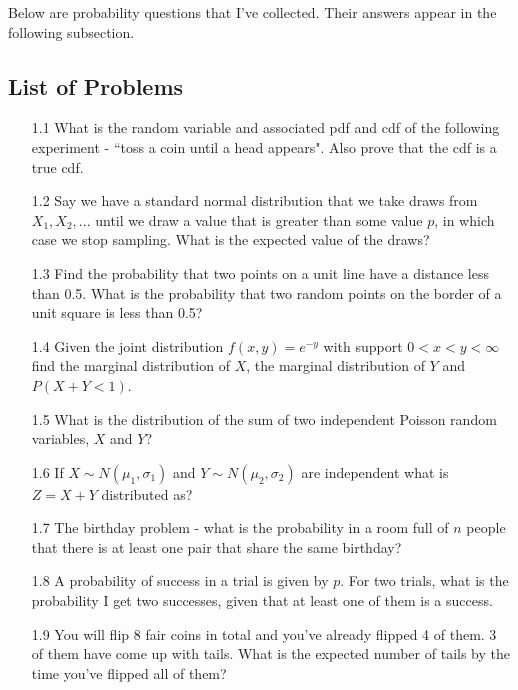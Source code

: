 Below are probability questions that I've collected. Their answers appear in the following subsection.

\subsection{List of Problems}

\begin{enumerate}
\item[1.1] What is the random variable and associated pdf and cdf of the following experiment - ``toss a coin until a head appears". Also prove that the cdf is a true cdf.

\item[1.2] Say we have a standard normal distribution that we take draws from $X_1, X_2, ...$ until we draw a value that is greater than some value $p$, in which case we stop sampling. What is the expected value of the draws?

\item[1.3] Find the probability that two points on a unit line have a distance less than 0.5. What is the probability that two random points on the border of a unit square is less than 0.5?

\item[1.4] Given the joint distribution $f(x,y) = e^{-y}$ with support $0<x<y< \infty$ find the marginal distribution of $X$, the marginal distribution of $Y$ and $P(X+Y<1)$.

\item[1.5] What is the distribution of the sum of two independent Poisson random variables, $X$ and $Y$?

\item[1.6] If $X \sim N(\mu_1, \sigma_1)$ and $Y \sim N(\mu_2, \sigma_2)$ are independent what is $Z=X+Y$ distributed as?

\item[1.7] The birthday problem - what is the probability in a room full of $n$ people that there is at least one pair that share the same birthday?

\item[1.8] A probability of success in a trial is given by $p$. For two trials, what is the probability I get two successes, given that at least one of them is a success. 

\item[1.9]
You will flip 8 fair coins in total and you've already flipped 4 of them. 3 of them have come up with tails. What is the expected number of tails by the time you've flipped all of them?


\end{enumerate}
